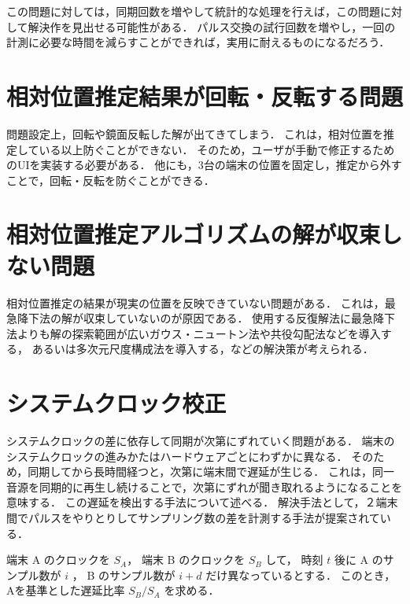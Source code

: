 この問題に対しては，同期回数を増やして統計的な処理を行えば，この問題に対して解決作を見出せる可能性がある．
パルス交換の試行回数を増やし，一回の計測に必要な時間を減らすことができれば，実用に耐えるものになるだろう．




\section{相対位置推定結果が回転・反転する問題}

問題設定上，回転や鏡面反転した解が出てきてしまう．
これは，相対位置を推定している以上防ぐことができない．
そのため，ユーザが手動で修正するためのUIを実装する必要がある．
他にも，3台の端末の位置を固定し，推定から外すことで，回転・反転を防ぐことができる．



\section{相対位置推定アルゴリズムの解が収束しない問題}

相対位置推定の結果が現実の位置を反映できていない問題がある．
これは，最急降下法の解が収束していないのが原因である．
使用する反復解法に最急降下法よりも解の探索範囲が広いガウス・ニュートン法や共役勾配法などを導入する，
あるいは多次元尺度構成法を導入する，などの解決策が考えられる．






\section{システムクロック校正}
システムクロックの差に依存して同期が次第にずれていく問題がある．
端末のシステムクロックの進みかたはハードウェアごとにわずかに異なる．
そのため，同期してから長時間経つと，次第に端末間で遅延が生じる．
これは，同一音源を同期的に再生し続けることで，次第にずれが聞き取れるようになることを意味する．
この遅延を検出する手法について述べる．
解決手法として，２端末間でパルスをやりとりしてサンプリング数の差を計測する手法が提案されている\cite{tpsn}．

端末 A のクロックを $S_A$，
端末 B のクロックを $S_B$ して，
時刻 $t$ 後に
A のサンプル数が $i$ ，
B のサンプル数が $i+d$ だけ異なっているとする．
このとき，Aを基準とした遅延比率 $S_B/S_A$ を求める．

